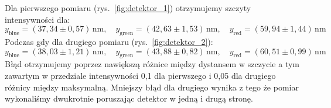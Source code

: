 \documentclass[12pt]{article}
\begin{document}
Dla pierwszego pomiaru (rys.~\ref{fig:detektor_1}) otrzymujemy szczyty intensywności dla:
\[
    y_{\mathrm{blue}} = (37{,}34 \pm 0{,}57) \, \mathrm{nm}, \quad y_{\mathrm{green}} = (42{,}63 \pm 1{,}53) \, \mathrm{nm}, \quad y_{\mathrm{red}} = (59{,}94 \pm 1{,}44) \, \mathrm{nm}
\]
Podczas gdy dla drugiego pomiaru (rys.~\ref{fig:detektor_2}):
\[
    y_{\mathrm{blue}} = (38{,}03 \pm 1{,}21) \, \mathrm{nm}, \quad y_{\mathrm{green}} = (43{,}88 \pm 0{,}82) \, \mathrm{nm}, \quad y_{\mathrm{red}} = (60{,}51 \pm 0{,}99) \, \mathrm{nm}
\]
Błąd otrzymujemy poprzez nawiększą różnice między dystansem w szczycie a tym zawartym w przedziale intensywności 0{,}1 dla pierwszego i 0{,}05 dla drugiego różnicy między maksymalną. Mniejszy błąd dla drugiego wynika z tego że pomiar wykonaliśmy dwukrotnie poruszając detektor w jedną i drugą stronę.
\end{document}

